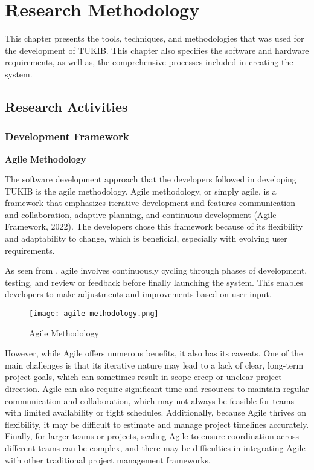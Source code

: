 \chapter{Research Methodology}
This chapter presents the tools, techniques, and methodologies that was used for the development of TUKIB. This chapter also specifies the software and hardware requirements, as well as, the comprehensive processes included in creating the system.

\section{Research Activities}

\subsection{Development Framework}

\textbf{Agile Methodology}

The software development approach that the developers followed in developing TUKIB is the agile methodology. Agile methodology, or simply agile, is a framework that emphasizes iterative development and features communication and collaboration, adaptive planning, and continuous development (Agile Framework, 2022). The developers chose this framework because of its flexibility and adaptability to change, which is beneficial, especially with evolving user requirements. 

As seen from , agile involves continuously cycling through phases of development, testing, and review or feedback before finally launching the system. This enables developers to make adjustments and improvements based on user input. 

\begin{figure}[h]
	\centering 
	\texttt{[image: agile methodology.png]}
	\caption{Agile Methodology}
	\label{fig:agile}
\end{figure}

However, while Agile offers numerous benefits, it also has its caveats. One of the main challenges is that its iterative nature may lead to a lack of clear, long-term project goals, which can sometimes result in scope creep or unclear project direction. Agile can also require significant time and resources to maintain regular communication and collaboration, which may not always be feasible for teams with limited availability or tight schedules. Additionally, because Agile thrives on flexibility, it may be difficult to estimate and manage project timelines accurately. Finally, for larger teams or projects, scaling Agile to ensure coordination across different teams can be complex, and there may be difficulties in integrating Agile with other traditional project management frameworks. \newline


